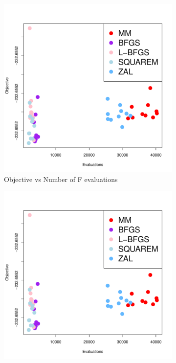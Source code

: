 \documentclass[12pt]{article}
\begin{document}
\begin{figure}
    \centering
    \begin{subfigure}[!htbp]{0.45\textwidth}
        \centering
        \includegraphics[width = \textwidth]{plots/eigen-objVSeval_sd10.pdf}
        \caption{Objective vs Number of F evaluations}
        \label{subfig:eigen-objVSeval}
    \end{subfigure}
    \begin{subfigure}[h]{0.45\textwidth}
        \centering
        \includegraphics[width = \textwidth]{plots/eigen-objVSeval_sd10.pdf}

\end{subfigure}
\end{figure}
\end{document}
